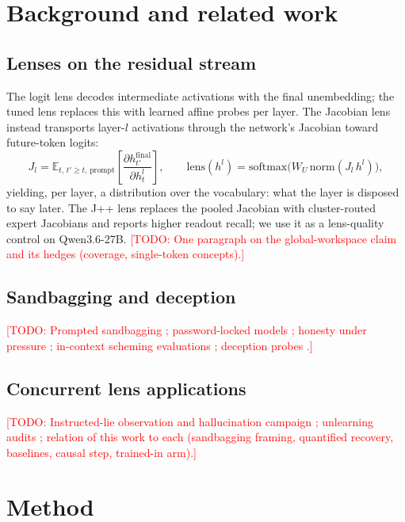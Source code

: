 \documentclass[11pt]{article}
\newcommand{\todo}[1]{\textcolor{red}{[TODO: #1]}}
\begin{document}
\section{Background and related work}
\subsection{Lenses on the residual stream}
The logit lens \citep{nostalgebraist2020logitlens} decodes intermediate activations with the final unembedding; the tuned lens \citep{belrose2023tuned} replaces this with learned affine probes per layer. The Jacobian lens \citep{anthropic2026workspace} instead transports layer-$l$ activations through the network's Jacobian toward future-token logits:
\begin{equation}
J_l = \mathbb{E}_{t,\,t' \ge t,\,\text{prompt}}\!\left[\frac{\partial h^{\mathrm{final}}_{t'}}{\partial h^{l}_{t}}\right],
\qquad
\mathrm{lens}(h^l) = \mathrm{softmax}\!\big(W_U\,\mathrm{norm}(J_l\, h^l)\big),
\end{equation}
yielding, per layer, a distribution over the vocabulary: what the layer is disposed to say later. The J++ lens \citep{ayonrinde2026jpplens} replaces the pooled Jacobian with cluster-routed expert Jacobians and reports higher readout recall; we use it as a lens-quality control on Qwen3.6-27B. \todo{One paragraph on the global-workspace claim and its hedges (coverage, single-token concepts).}

\subsection{Sandbagging and deception}
\todo{Prompted sandbagging \citep{vanderweij2024sandbagging}; password-locked models \citep{greenblatt2024password}; honesty under pressure \citep{mask2025}; in-context scheming evaluations \citep{apollo2024scheming}; deception probes \citep{pressure2026probes,oneprobe2026}.}

\subsection{Concurrent lens applications}
\todo{Instructed-lie observation and hallucination campaign \citep{solarkyle2026lenses}; unlearning audits \citep{ziruibest2026unlearning}; relation of this work to each (sandbagging framing, quantified recovery, baselines, causal step, trained-in arm).}

\section{Method}
\end{document}
